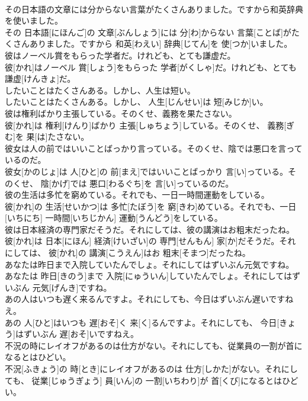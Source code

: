 \documentclass[8pt]{extreport}
\begin{document}
\begin{CJK}{UTF8}{min}
\\	その日本語の文章には分からない言葉がたくさんありました。ですから和英辞典を使いました。	
\\	その 日本語[にほんご]の 文章[ぶんしょう]には 分[わ]からない 言葉[ことば]がたくさんありました。ですから 和英[わえい] 辞典[じてん]を 使[つか]いました。
\\	彼はノーベル賞をもらった学者だ。けれども、とても謙虚だ。	
\\	彼[かれ]はノーベル 賞[しょう]をもらった 学者[がくしゃ]だ。けれども、とても 謙虚[けんきょ]だ。
\\	したいことはたくさんある。しかし、人生は短い。	
\\	したいことはたくさんある。しかし、 人生[じんせい]は 短[みじか]い。
\\	彼は権利ばかり主張している。そのくせ、義務を果たさない。	
\\	彼[かれ]は 権利[けんり]ばかり 主張[しゅちょう]している。そのくせ、 義務[ぎむ]を 果[は]たさない。
\\	彼女は人の前ではいいことばっかり言っている。そのくせ、陰では悪口を言っているのだ。	
\\	彼女[かのじょ]は 人[ひと]の 前[まえ]ではいいことばっかり 言[い]っている。そのくせ、 陰[かげ]では 悪口[わるぐち]を 言[い]っているのだ。
\\	彼の生活は多忙を窮めている。それでも、一日一時間運動をしている。	
\\	彼[かれ]の 生活[せいかつ]は 多忙[たぼう]を 窮[きわ]めている。それでも、一日[いちにち] 一時間[いちじかん] 運動[うんどう]をしている。
\\	彼は日本経済の専門家だそうだ。それにしては、彼の講演はお粗末だったね。	
\\	彼[かれ]は 日本[にほん] 経済[けいざい]の 専門[せんもん] 家[か]だそうだ。それにしては、 彼[かれ]の 講演[こうえん]はお 粗末[そまつ]だったね。
\\	あなたは昨日まで入院していたんでしょ。それにしてはずいぶん元気ですね。	
\\	あなたは 昨日[きのう]まで 入院[にゅういん]していたんでしょ。それにしてはずいぶん 元気[げんき]ですね。
\\	あの人はいつも遅く来るんですよ。それにしても、今日はずいぶん遅いですねえ。	
\\	あの 人[ひと]はいつも 遅[おそ]く 来[く]るんですよ。それにしても、 今日[きょう]はずいぶん 遅[おそ]いですねえ。
\\	不況の時にレイオフがあるのは仕方がない。それにしても、従業員の一割が首になるとはひどい。	
\\	不況[ふきょう]の 時[とき]にレイオフがあるのは 仕方[しかた]がない。それにしても、 従業[じゅうぎょう] 員[いん]の 一割[いちわり]が 首[くび]になるとはひどい。

\end{CJK}
\end{document}
